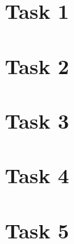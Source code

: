 \documentclass[%
   11pt,              %
   ngerman,           %
   a4paper,           %
   DIV11,             %
]{scrartcl}%
\begin{document}
\section*{Task 1}
\section*{Task 2}
\section*{Task 3}
\section*{Task 4}
\section*{Task 5}
\end{document}
